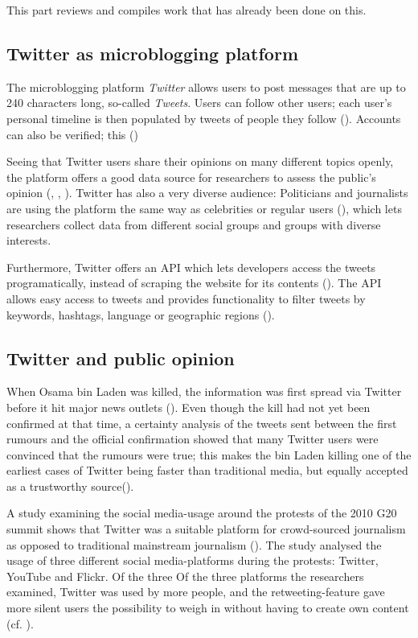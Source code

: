 This part reviews and compiles work that has already been done on this.

\subsection{Twitter as microblogging platform}
The microblogging platform \emph{Twitter} allows users to post messages that are up to 240 characters long, so-called \emph{Tweets}. Users can follow other users; each user's personal timeline is then populated by tweets of people they follow (\cite{thimm_twitter_2012}). Accounts can also be verified; this  (\cite{twitter_inc_about_nodate-1})

Seeing that Twitter users share their opinions on many different topics openly, the platform offers a good data source for researchers to assess the public's opinion (\cite{pak2010twitter}, \cite{pfaffenberger2016twitter}, \cite{broniatowski2014twitter}). Twitter has also a very diverse audience: Politicians and journalists are using the platform the same way as celebrities or regular users (\cite{pak2010twitter}), which lets researchers collect data from different social groups and groups with diverse interests.

Furthermore, Twitter offers an API which lets developers access the tweets programatically, instead of scraping the website for its contents (\cite{twitter_inc_about_nodate}). The API allows easy access to tweets and provides functionality to filter tweets by keywords, hashtags, language or geographic regions (\cite{bello2017detecting}).

\subsection{Twitter and public opinion}
When Osama bin Laden was killed, the information was first spread via Twitter before it hit major news outlets (\cite{hu2012breaking}). 
Even though the kill had not yet been confirmed at that time, a certainty analysis of the tweets sent between the first rumours and the official confirmation showed that many Twitter users were convinced that the rumours were true; this makes the bin Laden killing one of the earliest cases of Twitter being faster than traditional media, but equally accepted as a trustworthy source(\cite[2751]{hu2012breaking}).

A study examining the social media-usage around the protests of the 2010 G20 summit shows that Twitter was a suitable platform for crowd-sourced journalism as opposed to traditional mainstream journalism (\cite{poell2012twitter}). The study analysed the usage of three different social media-platforms during the protests: Twitter, YouTube and Flickr. Of the three Of the three platforms the researchers examined, Twitter was used by more people, and the retweeting-feature gave more silent users the possibility to weigh in without having to create own content (cf. \cite[709]{poell2012twitter}).